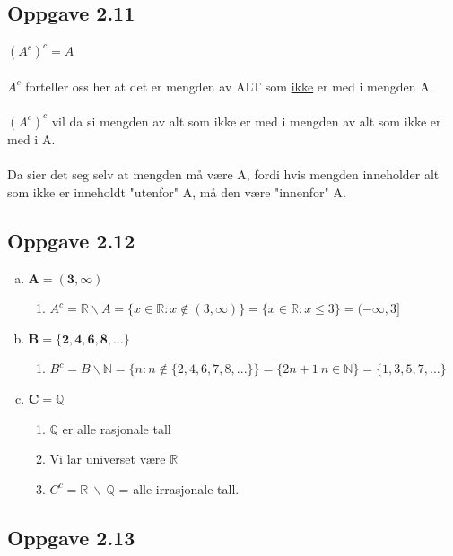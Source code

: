 \documentclass{article}
\begin{document}
\subsection*{Oppgave 2.11}
\((A^c)^c = A\) \\ \\
\(A^c\) forteller oss her at det er mengden av ALT som \underline{ikke} er med i mengden A. \\ \\
\((A^c)^c\) vil da si mengden av alt som ikke er med i mengden av alt som ikke er med i A. \\ \\
Da sier det seg selv at mengden må være A, fordi hvis mengden inneholder alt som ikke er inneholdt "utenfor" A, må den være "innenfor" A.

\subsection*{Oppgave 2.12}
\begin{enumerate}[a.]
    \item \(\mathbf{A = (3, \infty)}\)
    \begin{enumerate}[-]
        \item \(A^c = \mathbb{R} \backslash A = \{x \in \mathbb{R} : x \notin (3, \infty)\} = \{x \in \mathbb{R} : x \le 3\} = (-\infty, 3]\) 
    \end{enumerate}

    \item \(\mathbf{B = \{2, 4, 6, 8, ...\}}\)
    \begin{enumerate}[-]
        \item \(B^c = B \backslash \mathbb{N} = \{n : n \notin \{2, 4, 6, 7, 8, ... \}\} = \{2n+1 \: n \in \mathbb{N}\} = \{1, 3, 5, 7, ...\}\)
    \end{enumerate}

    \item \(\mathbf{C = \mathbb{Q}}\)
    \begin{enumerate}[-]
        \item $\mathbb{Q}$ er alle rasjonale tall
        \item Vi lar universet være $\mathbb{R}$
        \item \(C^c = \mathbb{R} \ \backslash \ \mathbb{Q}\) = alle irrasjonale tall.
    \end{enumerate}
\end{enumerate}

\newpage

\subsection*{Oppgave 2.13}
\end{document}
